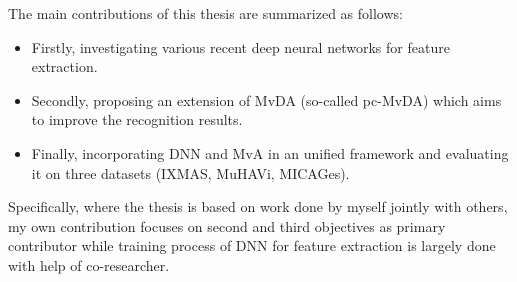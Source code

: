         The main contributions of this thesis are summarized as follows: 
        \begin{itemize}
            \item Firstly, investigating various recent deep neural networks for feature extraction.
            \item Secondly, proposing an extension of MvDA (so-called pc-MvDA) which aims to improve the recognition results.
            \item Finally, incorporating DNN and MvA in an unified framework and evaluating it on three datasets (IXMAS, MuHAVi, MICAGes).
        \end{itemize}

        Specifically, where the thesis is based on work done by myself jointly with others, my own contribution focuses on second and third objectives as primary contributor while training process of DNN for feature extraction is largely done with help of co-researcher.

